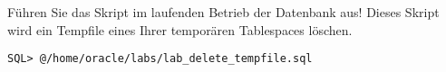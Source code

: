     \item Führen Sie das Skript  im laufenden Betrieb der Datenbank aus! Dieses Skript wird ein Tempfile eines Ihrer temporären Tablespaces löschen.
    \begin{lstlisting}[language=terminal]
SQL> @/home/oracle/labs/lab_delete_tempfile.sql
    \end{lstlisting}
